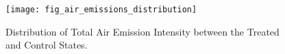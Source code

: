 \begin{figure}[H]
    \centering
    \texttt{[image: fig\_air\_emissions\_distribution]}
    \caption{Distribution of Total Air Emission Intensity between the Treated and Control States.}
    \label{fig:air_emissions_distribution}
\end{figure}